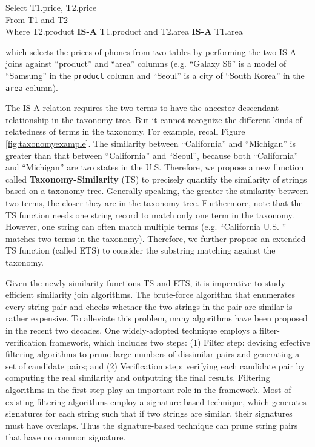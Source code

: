 \vspace{2mm}

\noindent \textsf{Select T1.price, T2.price} \\
\noindent \textsf{ From T1 and T2} \\
\noindent   \textsf{Where T2.product \textbf{IS-A} T1.product and T2.area \textbf{IS-A} T1.area}

 \vspace{2mm}


\noindent which selects the prices of phones from two tables by performing the two IS-A joins against ``\textsf{product}'' and ``\textsf{area}'' columns (e.g. ``\textsf{Galaxy S6}'' is a model of ``\textsf{Samsung}'' in the \texttt{product} column and ``\textsf{Seoul}'' is a city of ``\textsf{South Korea}'' in the \texttt{area} column).


The IS-A relation requires the two terms to have the ancestor-descendant relationship in the taxonomy tree. But it cannot recognize the different kinds of relatedness of terms in the taxonomy. For example, recall Figure \ref{fig:taxonomyexample}. The similarity between ``\textsf{California}'' and ``\textsf{Michigan}'' is greater than that between ``\textsf{California}'' and ``\textsf{Seoul}'', because  both ``\textsf{California}'' and ``\textsf{Michigan}'' are two states in the U.S. Therefore, we propose a new function called \textbf{Taxonomy-Similarity} (TS) to precisely quantify the similarity of strings based on a taxonomy tree. Generally speaking,  the greater the similarity between two terms, the closer they are in the taxonomy tree.  Furthermore, note that the TS function needs one string record to  match only one term in the taxonomy. However, one string can often match multiple terms (e.g. ``\textsf{California U.S.} '' matches two terms in the taxonomy). Therefore, we further propose an extended TS function (called ETS) to  consider the substring matching against the taxonomy.


Given the newly similarity functions TS and ETS, it is imperative to study efficient similarity join algorithms. The brute-force algorithm that enumerates every string pair and checks whether the two strings in the pair are similar is rather expensive. To alleviate this problem, many algorithms have been proposed in the recent two decades. One widely-adopted technique employs a filter-verification framework, which includes two steps: (1) Filter step: devising effective filtering algorithms to prune large numbers of dissimilar pairs and generating a set of candidate pairs; and (2) Verification step: verifying each candidate pair by computing
the real similarity and outputting the final results. Filtering algorithms in the first step play an important role
in the framework. Most of existing filtering algorithms employ a signature-based technique, which generates signatures for each string such that if two strings are similar, their signatures must have overlaps. Thus the signature-based technique can prune string pairs that have no common signature.

